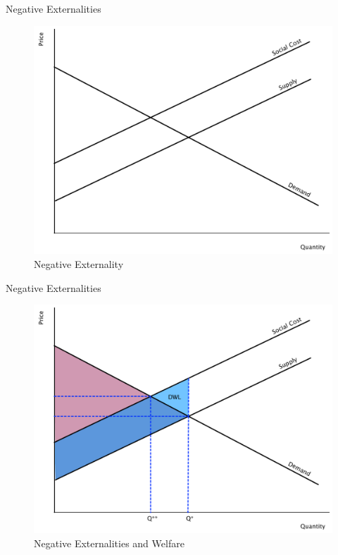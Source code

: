 \documentclass[xcolor={dvipsnames},pdf, hyperref={colorlinks=true, citecolor=ForestGreen, linkcolor=BlueViolet, urlcolor=Magenta}]{beamer}
\begin{document}
\begin{frame}[b]{Negative Externalities}
\begin{figure}[H]
			\centering
			\includegraphics[scale=.35]{plot50.pdf}
			\caption{Negative Externality}
		\end{figure}

\end{frame}

\begin{frame}[b]{Negative Externalities}	
		\begin{figure}[H]
			\centering
			\includegraphics[scale=.35]{plot51.pdf}
			\caption{Negative Externalities and Welfare}
		\end{figure}
\end{frame}
\end{document}
